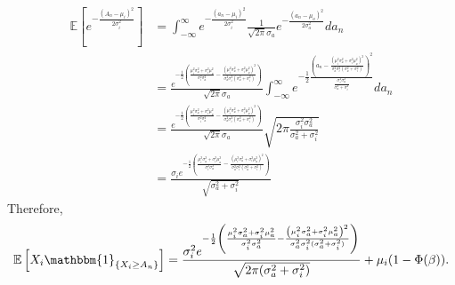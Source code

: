 \documentclass[fleqn,mnsc,nonblindrev]{informs4}
\newcommand{\ex}[1]{\mathbb{E}\left[#1\right]}
\begin{document}
\begin{align*}
\ex{e^{-\frac{(A_n-\mu_i)^2}{2\sigma_i^2}}}&=\int_{-\infty}^{\infty}e^{-\frac{(a_n-\mu_i)^2}{2\sigma_i^2}}\frac{1}{\sqrt{2\pi}\sigma_{a}}e^{-\frac{(a_n-\mu_a)^2}{2\sigma_a^2}}da_n\\
&=\frac{e^{-\frac{1}{2}\left(\frac{\mu_i^2\sigma_a^2+\sigma_i^2\mu_a^2}{\sigma_i^2\sigma_a^2}-\frac{\left(\mu_i^2\sigma_a^2+\sigma_i^2\mu_a^2\right)^2}{\sigma_a^2\sigma_i^2(\sigma_a^2+\sigma_i^2)}\right)}}{\sqrt{2\pi}\sigma_{a}}\int_{-\infty}^{\infty}e^{-\frac{1}{2}\frac{\left(a_n-\frac{\left(\mu_i^2\sigma_a^2+\sigma_i^2\mu_a^2\right)^2}{\sigma_a^2\sigma_i^2(\sigma_a^2+\sigma_i^2)}\right)^2}{\frac{\sigma_i^2\sigma_a^2}{\sigma_a^2+\sigma_i^2}}}d a_n\\
&=\frac{e^{-\frac{1}{2}\left(\frac{\mu_i^2\sigma_a^2+\sigma_i^2\mu_a^2}{\sigma_i^2\sigma_a^2}-\frac{\left(\mu_i^2\sigma_a^2+\sigma_i^2\mu_a^2\right)^2}{\sigma_a^2\sigma_i^2(\sigma_a^2+\sigma_i^2)}\right)}}{\sqrt{2\pi}\sigma_{a}}\sqrt{2\pi\frac{\sigma_i^2\sigma_a^2}{\sigma_a^2+\sigma_i^2}}\\
&=\frac{\sigma_ie^{-\frac{1}{2}\left(\frac{\mu_i^2\sigma_a^2+\sigma_i^2\mu_a^2}{\sigma_i^2\sigma_a^2}-\frac{\left(\mu_i^2\sigma_a^2+\sigma_i^2\mu_a^2\right)^2}{\sigma_a^2\sigma_i^2(\sigma_a^2+\sigma_i^2)}\right)}}{\sqrt{\sigma_a^2+\sigma_i^2}}
\end{align*}
Therefore,
\begin{align*}
\ex{X_i\mathbbm{1}_{\{X_i\geq A_n\}}}=\frac{\sigma_i^2e^{-\frac{1}{2}\left(\frac{\mu_i^2\sigma_a^2+\sigma_i^2\mu_a^2}{\sigma_i^2\sigma_a^2}-\frac{\left(\mu_i^2\sigma_a^2+\sigma_i^2\mu_a^2\right)^2}{\sigma_a^2\sigma_i^2(\sigma_a^2+\sigma_i^2)}\right)}}{\sqrt{2\pi(\sigma_a^2+\sigma_i^2)}}+\mu_i(1-\Phi(\beta)).
\end{align*}
\end{document}
